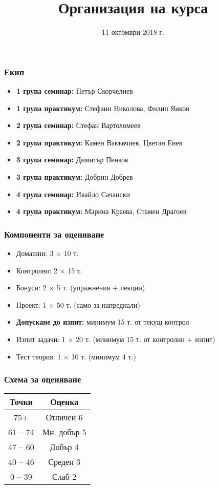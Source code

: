 \documentclass{beamer}
\title{Организация на курса}
\date{11 октомври 2018 г.}
\begin{document}
\begin{frame}
  \titlepage
\end{frame}

\begin{frame}
  \frametitle{Екип}

  \begin{itemize}
  \item \textbf{1 група семинар:} Петър Скорчелиев
  \item \textbf{1 група практикум:} Стефани Николова, Филип Янков
  \item \textbf{2 група семинар:} Стефан Вартоломеев
  \item \textbf{2 група практикум:} Камен Вакъвчиев, Цветан Енев
  \item \textbf{3 група семинар:} Димитър Пенков
  \item \textbf{3 група практикум:} Добрин Добрев
  \item \textbf{4 група семинар:} Ивайло Сачански
  \item \textbf{4 група практикум:} Марина Краева, Стамен Драгоев
  \end{itemize}
\end{frame}

\begin{frame}
  \frametitle{Компоненти за оценяване}
  
  \begin{itemize}
  \item Домашни: 3 $\times$ 10 т.
  \item Контролно: 2 $\times$ 15 т.
  \item Бонуси: 2 $\times$ 5 т. (упражнения + лекции)
  \item Проект: 1 $\times$ 50 т. (само за напреднали)
  \item \textbf{Допускане до изпит:} минимум 15 т. от текущ контрол
  \item Изпит задачи: 1 $\times$ 20 т. \alert{(минимум 15 т. от контролни + изпит)}
  \item Тест теория: 1 $\times$ 10 т. \alert{(минимум 4 т.)}
  \end{itemize}
\end{frame}

\begin{frame}
  \frametitle{Схема за оценяване}

  \begin{center}
    \begin{tabular}{|c|c|}
      \hline
      \textbf{Точки} & \textbf{Оценка}\\
      \hline\hline
      75+&Отличен 6\\
      \hline
      61 -- 74&Мн. добър 5\\
      \hline
      47 -- 60&Добър 4\\
      \hline
      40  -- 46&Среден 3\\
      \hline
      0  --  39&Слаб 2\\
      \hline
    \end{tabular}
  \end{center}
\end{frame}
\end{document}
